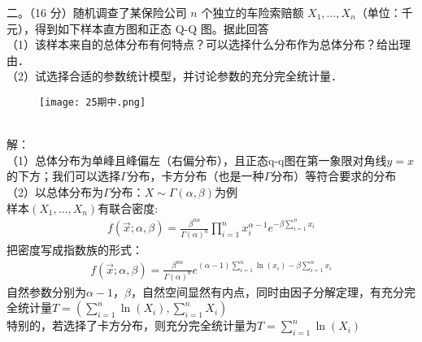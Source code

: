 \documentclass[12pt]{article}
\begin{document}
\noindent 二。（16 分）随机调查了某保险公司 $n$ 个独立的车险索赔额 $X_{1}, \ldots, X_{n}$（单位：千元），得到如下样本直方图和正态 Q-Q 图。据此回答\\
（1）该样本来自的总体分布有何特点？可以选择什么分布作为总体分布？给出理由．\\
（2）试选择合适的参数统计模型，并讨论参数的充分完全统计量．\\
\begin{figure}[h]  
\centering  
\texttt{[image: 25期中.png]}  
\label{fig:my_label}  
\end{figure}
\\
解：\\
（1）总体分布为单峰且峰偏左（右偏分布），且正态q-q图在第一象限对角线$y=x$的下方；我们可以选择$\Gamma$分布，卡方分布（也是一种$\Gamma$分布）等符合要求的分布\\
（2）以总体分布为$\Gamma$分布：$X \sim \Gamma(\alpha,\beta)$为例\\
样本$(X_1,...,X_n)$有联合密度:
\begin{gather}
	f(\vec{x};\alpha,\beta)=\frac{\beta^{n\alpha}}{\Gamma(\alpha)^n} \prod_{i=1}^{n} x_i^{\alpha-1} e^{-\beta \sum_{i=1}^{n} x_i}
\end{gather}
把密度写成指数族的形式：\\
\begin{gather}
f(\vec{x};\alpha,\beta)=\frac{\beta^{n\alpha}}{\Gamma(\alpha)^n} e^{(\alpha-1)\sum_{i=1}^n \ln(x_i)-\beta\sum_{i=1}^n x_i}
\end{gather}
自然参数分别为$\alpha-1$，$\beta$，自然空间显然有内点，同时由因子分解定理，有充分完全统计量$T=\left( \sum\limits_{i=1}^n \ln(X_i),\sum\limits_{i=1}^n X_i\right) $\\
特别的，若选择了卡方分布，则充分完全统计量为$T=\sum\limits_{i=1}^n \ln(X_i)$\\
\end{document}
